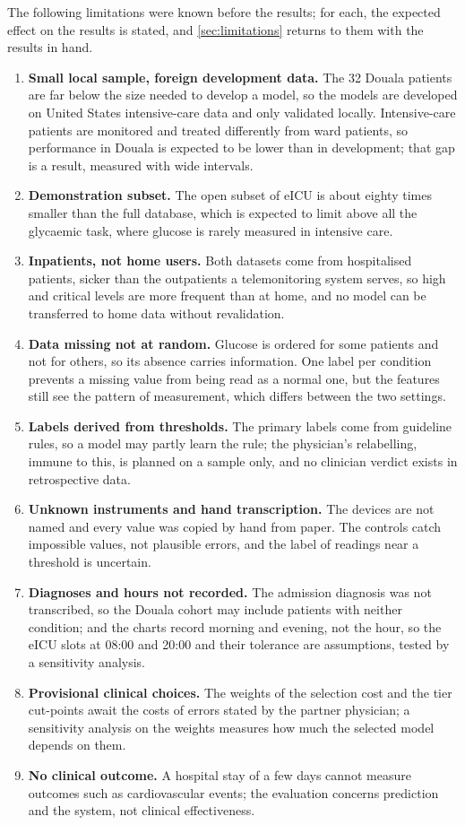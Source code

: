 The following limitations were known before the results; for each, the expected effect on the results is stated, and \cref{sec:limitations} returns to them with the results in hand.
\begin{enumerate}
  \item \textbf{Small local sample, foreign development data.} The 32 Douala patients are far below the size needed to develop a model, so the models are developed on United States intensive-care data and only validated locally. Intensive-care patients are monitored and treated differently from ward patients, so performance in Douala is expected to be lower than in development; that gap is a result, measured with wide intervals.
  \item \textbf{Demonstration subset.} The open subset of eICU is about eighty times smaller than the full database, which is expected to limit above all the glycaemic task, where glucose is rarely measured in intensive care.
  \item \textbf{Inpatients, not home users.} Both datasets come from hospitalised patients, sicker than the outpatients a telemonitoring system serves, so high and critical levels are more frequent than at home, and no model can be transferred to home data without revalidation.
  \item \textbf{Data missing not at random.} Glucose is ordered for some patients and not for others, so its absence carries information. One label per condition prevents a missing value from being read as a normal one, but the features still see the pattern of measurement, which differs between the two settings.
  \item \textbf{Labels derived from thresholds.} The primary labels come from guideline rules, so a model may partly learn the rule; the physician's relabelling, immune to this, is planned on a sample only, and no clinician verdict exists in retrospective data.
  \item \textbf{Unknown instruments and hand transcription.} The devices are not named and every value was copied by hand from paper. The controls catch impossible values, not plausible errors, and the label of readings near a threshold is uncertain.
  \item \textbf{Diagnoses and hours not recorded.} The admission diagnosis was not transcribed, so the Douala cohort may include patients with neither condition; and the charts record morning and evening, not the hour, so the eICU slots at 08:00 and 20:00 and their tolerance are assumptions, tested by a sensitivity analysis.
  \item \textbf{Provisional clinical choices.} The weights of the selection cost and the tier cut-points await the costs of errors stated by the partner physician; a sensitivity analysis on the weights measures how much the selected model depends on them.
  \item \textbf{No clinical outcome.} A hospital stay of a few days cannot measure outcomes such as cardiovascular events; the evaluation concerns prediction and the system, not clinical effectiveness.
\end{enumerate}

